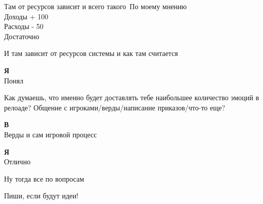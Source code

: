 Там от ресурсов зависит и всего такого\
По моему мнению\\
Доходы + 100\\
Расходы - 50\\
Достаточно

И там зависит от ресурсов системы и как там считается

\textbf{Я}\\
Понял

Как думаешь, что именно будет доставлять тебе наибольшее количество эмоций в релоаде? Общение с игроками/верды/написание приказов/что-то еще?

\textbf{В}\\
Верды и сам игровой процесс

\textbf{Я}\\
Отлично

Ну тогда все по вопросам

Пиши, если будут идеи!